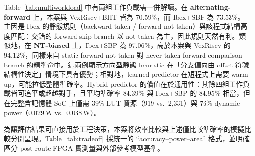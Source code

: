 \documentclass[12pt,a4paper]{article}
\begin{document}
	Table~\ref{tab:multiworkload} 中有兩組工作負載需一併解讀。在 \textbf{alternating-forward} 上，本案與 VexRiscv+BHT 皆為 70.59\%，而 Ibex+SBP 為 73.53\%。主因是 Ibex 的靜態規則（backward-taken / forward-not-taken）與該程式結構高度匹配：交錯的 forward skip-branch 以 not-taken 為主，因此規則天然有利。類似地，在 \textbf{NT-biased} 上，Ibex+SBP 為 97.06\%，高於本案與 VexRiscv 的 94.12\%，同樣來自 static forward-not-taken 對 never-taken forward comparison branch 的精準命中。這兩例顯示方向型靜態 heuristic 在「分支偏向由 offset 符號結構性決定」情境下具有優勢；相對地，learned predictor 在短程式上需要 warm-up，可能拉低整體準確率。Hybrid predictor 的價值在於通用性：其餘四組工作負載皆可追平或超越對手，且平均準確率 84.39\% 與 Ibex+SBP 的 84.95\% 相當，但在完整含記憶體 SoC 上僅需 39\% LUT 資源（919 vs.\ 2{,}331）與 76\% dynamic power（0.029\,W vs.\ 0.038\,W）。

	為讓評估結果可直接用於工程決策，本案將效率比較與上述僅比較準確率的模擬比較分開呈現。Table~\ref{tab:tradeoff} 採統一的 ``accuracy--power--area'' 格式，並明確區分 post-route FPGA 實測量與外部參考模型基準。
\end{document}
